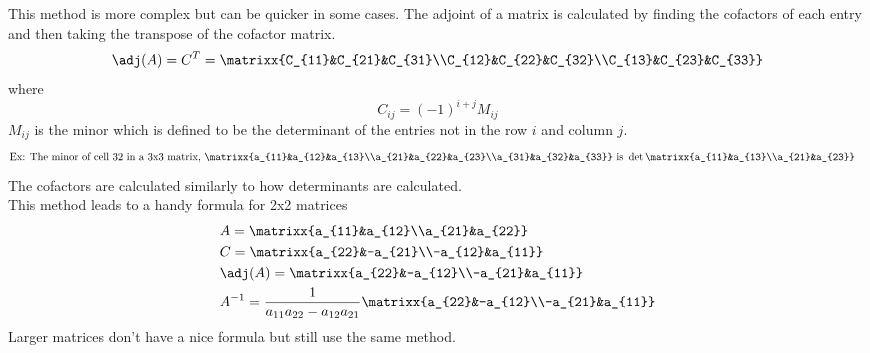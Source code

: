 This method is more complex but can be quicker in some cases.
The adjoint of a matrix is calculated by finding the cofactors of each entry and then taking the transpose of the cofactor matrix.
$$\adj(A)=C^T=\matrixx{C_{11}&C_{21}&C_{31}\\C_{12}&C_{22}&C_{32}\\C_{13}&C_{23}&C_{33}}$$
where
$$C_{ij}=(-1)^{i+j}M_{ij}$$
$M_{ij}$ is the minor which is defined to be the determinant of the entries not in the row $i$ and column $j$.
\begin{align*}
    \text{Ex: }&\text{The minor of cell $32$ in a 3x3 matrix, }\matrixx{a_{11}&a_{12}&a_{13}\\a_{21}&a_{22}&a_{23}\\a_{31}&a_{32}&a_{33}}\text{ is }\det\matrixx{a_{11}&a_{13}\\a_{21}&a_{23}}
\end{align*}
The cofactors are calculated similarly to how determinants are calculated.\\
This method leads to a handy formula for 2x2 matrices
\begin{align*}
    &A=\matrixx{a_{11}&a_{12}\\a_{21}&a_{22}}\\
    &C=\matrixx{a_{22}&-a_{21}\\-a_{12}&a_{11}}\\
    &\adj(A)=\matrixx{a_{22}&-a_{12}\\-a_{21}&a_{11}}\\
    &A^{-1}=\frac{1}{a_{11}a_{22}-a_{12}a_{21}}\matrixx{a_{22}&-a_{12}\\-a_{21}&a_{11}}
\end{align*}
Larger matrices don't have a nice formula but still use the same method.
